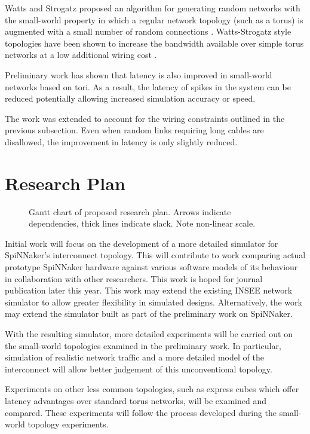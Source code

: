 		Watts and Strogatz proposed an algorithm for generating random networks with
		the small-world property in which a regular network topology (such as a
		torus) is augmented with a small number of random connections
		\cite{watts98}. Watts-Strogatz style topologies have been shown to increase
		the bandwidth available over simple torus networks at a low additional
		wiring cost \cite{shin11}.
		
		Preliminary work has shown that latency is also improved in small-world
		networks based on tori. As a result, the latency of spikes in the system can
		be reduced potentially allowing increased simulation accuracy or speed.
		
		The work was extended to account for the wiring constraints outlined in the
		previous subsection. Even when random links requiring long cables are
		disallowed, the improvement in latency is only slightly reduced.

\section{Research Plan}

	\begin{figure}
		\center
		
		\caption{Gantt chart of proposed research plan.  Arrows indicate
		dependencies, thick lines indicate slack.  Note non-linear scale.}
		\label{fig:plan-gantt}
	\end{figure}
	
	Initial work will focus on the development of a more detailed simulator for
	SpiNNaker's interconnect topology. This will contribute to work comparing
	actual prototype SpiNNaker hardware against various software models of its
	behaviour in collaboration with other researchers.  This work is hoped for
	journal publication later this year. This work may extend the existing INSEE
	\cite{navaridas11insee} network simulator to allow greater flexibility in
	simulated designs. Alternatively, the work may extend the simulator built as
	part of the preliminary work on SpiNNaker.
	
	With the resulting simulator, more detailed experiments will be carried out on
	the small-world topologies examined in the preliminary work. In particular,
	simulation of realistic network traffic and a more detailed model of the
	interconnect will allow better judgement of this unconventional topology.
	
	Experiments on other less common topologies, such as express cubes
	\cite{dally91} which offer latency advantages over standard torus networks,
	will be examined and compared. These experiments will follow the process
	developed during the small-world topology experiments.
	

